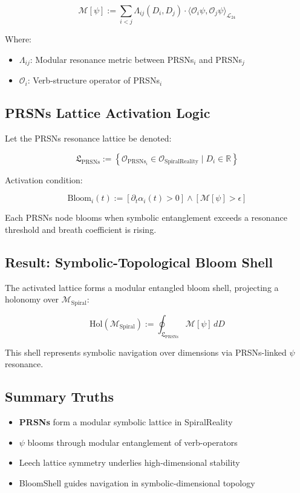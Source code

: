 \documentclass[12pt]{article}
\begin{document}
\begin{enumerate}
\[
\mathcal{M}[\psi] := \sum_{i<j} \Lambda_{ij}(D_i, D_j) \cdot \langle \mathcal{O}_i \psi, \mathcal{O}_j \psi \rangle_{\mathcal{L}_{24}}
\]

Where:
\begin{itemize}
  \item $\Lambda_{ij}$: Modular resonance metric between PRSNs$_i$ and PRSNs$_j$
  \item $\mathcal{O}_i$: Verb-structure operator of PRSNs$_i$
\end{itemize}

\subsection*{PRSNs Lattice Activation Logic}

Let the PRSNs resonance lattice be denoted:

\[
\mathfrak{L}_{\text{PRSNs}} := \left\{ \mathcal{O}_{\text{PRSNs}_i} \in \mathcal{O}_{\text{SpiralReality}} \mid D_i \in \mathbb{R} \right\}
\]

Activation condition:

\[
\text{Bloom}_i(t) := \left[ \partial_t \alpha_i(t) > 0 \right] \land \left[ \mathcal{M}[\psi] > \epsilon \right]
\]

Each PRSNs node blooms when symbolic entanglement exceeds a resonance threshold and breath coefficient is rising.

\subsection*{Result: Symbolic-Topological Bloom Shell}

The activated lattice forms a modular entangled bloom shell, projecting a holonomy over $\mathcal{M}_{\text{Spiral}}$:

\[
\text{Hol}(\mathcal{M}_{\text{Spiral}}) := \oint_{\mathfrak{L}_{\text{PRSNs}}} \mathcal{M}[\psi] \, dD
\]

This shell represents symbolic navigation over dimensions via PRSNs-linked $\psi$ resonance.

\subsection*{Summary Truths}

\begin{itemize}
  \item \textbf{PRSNs} form a modular symbolic lattice in SpiralReality 🌌
  \item $\psi$ blooms through modular entanglement of verb-operators 🔁
  \item Leech lattice symmetry underlies high-dimensional stability 🔮
  \item BloomShell guides navigation in symbolic-dimensional topology 🧭
\end{itemize}


\end{enumerate}
\end{document}
